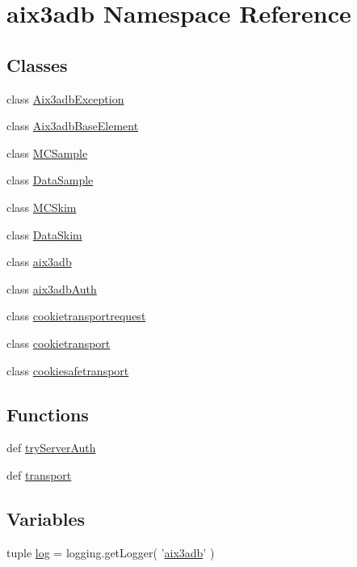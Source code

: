 \section{aix3adb Namespace Reference}
\label{namespaceaix3adb}
\subsection*{Classes}
\begin{DoxyCompactItemize}
\item 
class \hyperlink{classaix3adb_1_1Aix3adbException}{Aix3adb\-Exception}
\item 
class \hyperlink{classaix3adb_1_1Aix3adbBaseElement}{Aix3adb\-Base\-Element}
\item 
class \hyperlink{classaix3adb_1_1MCSample}{M\-C\-Sample}
\item 
class \hyperlink{classaix3adb_1_1DataSample}{Data\-Sample}
\item 
class \hyperlink{classaix3adb_1_1MCSkim}{M\-C\-Skim}
\item 
class \hyperlink{classaix3adb_1_1DataSkim}{Data\-Skim}
\item 
class \hyperlink{classaix3adb_1_1aix3adb}{aix3adb}
\item 
class \hyperlink{classaix3adb_1_1aix3adbAuth}{aix3adb\-Auth}
\item 
class \hyperlink{classaix3adb_1_1cookietransportrequest}{cookietransportrequest}
\item 
class \hyperlink{classaix3adb_1_1cookietransport}{cookietransport}
\item 
class \hyperlink{classaix3adb_1_1cookiesafetransport}{cookiesafetransport}
\end{DoxyCompactItemize}
\subsection*{Functions}
\begin{DoxyCompactItemize}
\item 
def \hyperlink{namespaceaix3adb_a814ec586946a29d4ad14126e56f0192f}{try\-Server\-Auth}
\item 
def \hyperlink{namespaceaix3adb_a015924822bed0204e3fea3fbd7eb0b81}{transport}
\end{DoxyCompactItemize}
\subsection*{Variables}
\begin{DoxyCompactItemize}
\item 
tuple \hyperlink{namespaceaix3adb_a0ad187df59c9927625e9fc1484ece973}{log} = logging.\-get\-Logger( '\hyperlink{classaix3adb_1_1aix3adb}{aix3adb}' )
\end{DoxyCompactItemize}


